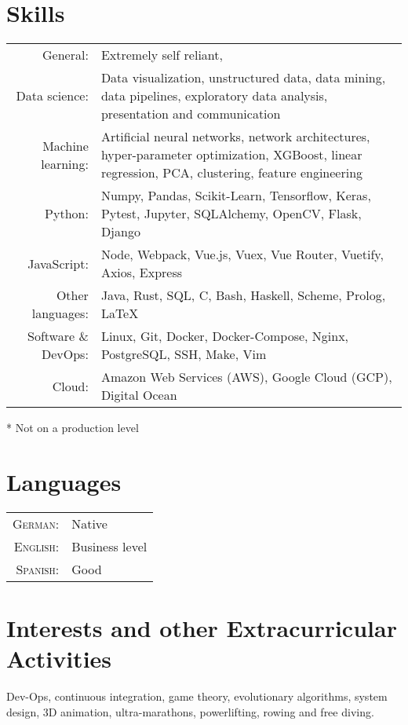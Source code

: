 \documentclass[a4paper,10pt]{article}
\begin{document}
\section{Skills}
\renewcommand{\thefootnote}{*}
\begin{threeparttable}
\begin{tabular}{ r p{} }

    General: & Extremely self reliant, \\

    Data science: & Data visualization, unstructured data, data mining, data
    pipelines, exploratory data analysis, presentation and communication \\

    Machine learning: & Artificial neural networks, network architectures,
    hyper-parameter optimization, XGBoost, linear regression, PCA, clustering,
    feature engineering \\

    Python: & Numpy, Pandas, Scikit-Learn, Tensorflow, Keras, Pytest, Jupyter,
    SQLAlchemy, OpenCV, Flask, Django \\

    JavaScript: & Node, Webpack, Vue.js, Vuex, Vue Router, Vuetify, Axios,
    Express \\

    Other languages: & Java, Rust, SQL, C, Bash, Haskell\footnotemark,
    Scheme\footnotemark, Prolog\footnotemark, \LaTeX \\

    Software \& DevOps: & Linux, Git, Docker, Docker-Compose, Nginx, PostgreSQL, SSH,
    Make, Vim \\

    Cloud: & Amazon Web Services (AWS), Google Cloud (GCP), Digital Ocean \\

\end{tabular}
\begin{tablenotes}
    \small\item[*] Not on a production level
  \end{tablenotes}
\end{threeparttable}

\section{Languages}
\begin{tabular}{rl}
\textsc{German:}  & Native \\
\textsc{English:} & Business level \\
\textsc{Spanish:} & Good \\
\end{tabular}

\section{Interests and other Extracurricular Activities }
Dev-Ops, continuous integration, game theory, evolutionary algorithms, system
design, 3D animation, ultra-marathons, powerlifting, rowing and free diving.
\end{document}
